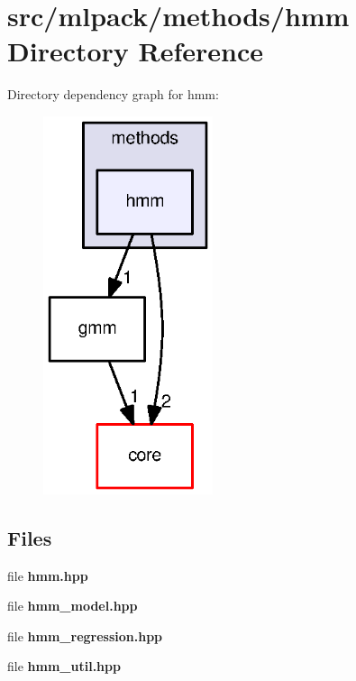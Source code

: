 \section{src/mlpack/methods/hmm Directory Reference}
\label{dir_693d33d6e5a445ae210c2bf5cba9783a}
Directory dependency graph for hmm\+:
\nopagebreak
\begin{figure}[H]
\begin{center}
\leavevmode
\includegraphics[width=141pt]{dir_693d33d6e5a445ae210c2bf5cba9783a_dep}
\end{center}
\end{figure}
\subsection*{Files}
\begin{DoxyCompactItemize}
\item 
file {\bf hmm.\+hpp}
\item 
file {\bf hmm\+\_\+model.\+hpp}
\item 
file {\bf hmm\+\_\+regression.\+hpp}
\item 
file {\bf hmm\+\_\+util.\+hpp}
\end{DoxyCompactItemize}
